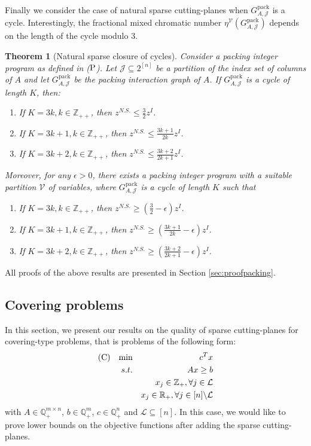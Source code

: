 \documentclass[smallextended]{svjour3}
\newtheorem{theorem}[proposition]{Theorem}
\begin{document}
Finally we consider the case of natural sparse cutting-planes when ${G^{\textrm{pack}}_{A, {\mathcal{J}}}}$ is a cycle. Interestingly, the fractional mixed chromatic number $\eta^{\mathcal{V}}({G^{\textrm{pack}}_{A, {\mathcal{J}}}})$ depends on the length of the cycle modulo 3.  

\begin{theorem}[Natural sparse closure of cycles]\label{thm:nscycle}
	Consider a packing integer program as defined in ($\textup{P}$). Let $\mathcal{J} \subseteq 2^{[n]}$ be a partition of the index
set of columns of $A$ and let ${G^{\textrm{pack}}_{A, {\mathcal{J}}}}$ be the packing interaction graph of $A$. If ${G^{\textrm{pack}}_{A, {\mathcal{J}}}}$ is a cycle of length $K$, then:
\begin{enumerate}
\item If $K  = 3k, k\in \mathbb{Z}_{++}$,
 then $z^{N.S.}\leq \frac{3}{2} z^I$.
\item If $ K  = 3k +1, k\in \mathbb{Z}_{++}$, then $z^{N.S.}\leq \frac{3k+1}{2k}z^I$.
\item If $ K  = 3k +2, k\in \mathbb{Z}_{++}$, then $z^{N.S.}\leq \frac{3k+2}{2k+1}z^I$.
\end{enumerate}
Moreover, for any $\epsilon > 0$, there exists a packing integer program with a suitable partition $\mathcal{V}$  of variables, where ${G^{\textrm{pack}}_{A, {\mathcal{J}}}}$ is a cycle of length $K$ such that
\begin{enumerate}
\item If $ K  = 3k, k\in \mathbb{Z}_{++}$, then $z^{N.S.}\geq \left(\frac{3}{2} - \epsilon \right)z^I$.
\item If $ K  = 3k +1, k\in \mathbb{Z}_{++}$, then $z^{N.S.}\geq \left(\frac{3k+1}{2k} - \epsilon\right)z^I$.
\item If $ K  = 3k +2, k\in \mathbb{Z}_{++}$, then $z^{N.S.}\geq \left(\frac{3k+2}{2k+1} - \epsilon\right)z^I$.
\end{enumerate}
\end{theorem}

All proofs of the above results are presented in Section \ref{sec:proofpacking}.

\subsection{Covering problems}\label{results:covering}
In this section, we present our results on the quality of sparse cutting-planes for covering-type problems, that is problems of the following form:
\begin{eqnarray}
\textup{(C)}~~~\textup{min}&& c^Tx \notag \\
s.t. &&Ax \geq b \notag \\
&&x_j \in \mathbb{Z}_+, \forall j \in \mathcal{L}  \notag \\
&&x_j \in \mathbb{R}_+, \forall j \in [n]\backslash \mathcal{L}
\notag
\end{eqnarray}
with $A \in \mathbb{Q}_+^{m \times n}$, $b\in \mathbb{Q}_+^m$, $c \in
\mathbb{Q}_+^{n}$ and $\mathcal{L} \subseteq [n]$. In this case, we would like to prove lower bounds on the objective functions after adding the sparse cutting-planes. 
\end{document}
